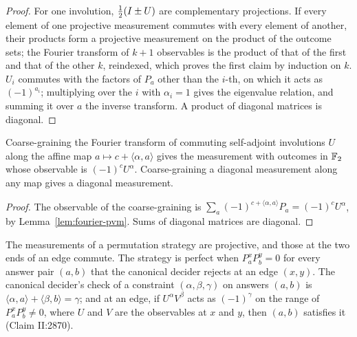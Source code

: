 \begin{proof}
\leanok
For one involution, $\frac12(I \pm U)$ are complementary projections. If every element of one
projective measurement commutes with every element of another, their products form a projective
measurement on the product of the outcome sets; the Fourier transform of $k + 1$ observables is
the product of that of the first and that of the other $k$, reindexed, which proves the first
claim by induction on $k$. $U_i$ commutes with the factors of $P_a$ other than the $i$-th, on
which it acts as $(-1)^{a_i}$; multiplying over the $i$ with $\alpha_i = 1$ gives the eigenvalue
relation, and summing it over $a$ the inverse transform. A product of diagonal matrices is
diagonal.
\end{proof}

\begin{lemma}
\label{lem:data-processing}
\leanok
Coarse-graining the Fourier transform of commuting self-adjoint involutions $U$ along the affine
map $a \mapsto c + \langle \alpha, a\rangle$ gives the measurement with outcomes in $\mathbb{F}_2$ whose
observable is $(-1)^c U^\alpha$. Coarse-graining a diagonal measurement along any map gives a
diagonal measurement.
\end{lemma}

\begin{proof}
\leanok
The observable of the coarse-graining is $\sum_a (-1)^{c + \langle \alpha, a\rangle} P_a =
(-1)^c U^\alpha$, by Lemma~\ref{lem:fourier-pvm}. Sums of diagonal matrices are diagonal.
\end{proof}

\begin{lemma}
\label{lem:perm-strategy-perfect}
\leanok
The measurements of a permutation strategy are projective, and those at the two ends of an edge
commute. The strategy is perfect when $P^x_a P^y_b = 0$ for every answer pair $(a, b)$ that the
canonical decider rejects at an edge $(x, y)$. The canonical decider's check of a constraint
$(\alpha, \beta, \gamma)$ on answers $(a, b)$ is $\langle \alpha, a\rangle + \langle \beta,
b\rangle = \gamma$; and at an edge, if $U^\alpha V^\beta$ acts as $(-1)^\gamma$ on the range of
$P^x_a P^y_b \neq 0$, where $U$ and $V$ are the observables at $x$ and $y$, then $(a, b)$
satisfies it (Claim II:2870).
\end{lemma}

